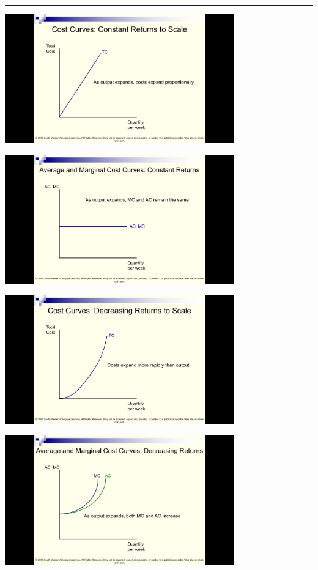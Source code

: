 \documentclass[]{article}
\begin{document}
\begin{center}\rule{0.5\linewidth}{\linethickness}\end{center}

\includegraphics[height=2.2in]{picsfigs/crsTCcurve.png}

\includegraphics[height=2.2in]{picsfigs/crscostcurves}

\includegraphics[height=2.2in]{picsfigs/drsTCcurve.png}

\includegraphics[height=2.2in]{picsfigs/drscostcurves}
\end{document}
